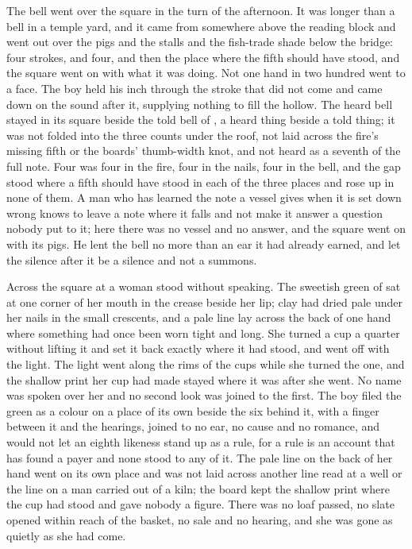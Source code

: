 The bell went over the square in the turn of the afternoon. It was longer than a bell in a temple yard, and it came from somewhere above the reading block and went out over the pigs and the stalls and the fish-trade shade below the bridge: four strokes, and four, and then the place where the fifth should have stood, and the square went on with what it was doing. Not one hand in two hundred went to a face. The boy held his inch through the stroke that did not come and came down on the sound after it, supplying nothing to fill the hollow. The heard bell stayed in its square beside the told bell of , a heard thing beside a told thing; it was not folded into the three counts under the roof, not laid across the fire's missing fifth or the boards' thumb-width knot, and not heard as a seventh of the full note. Four was four in the fire, four in the nails, four in the bell, and the gap stood where a fifth should have stood in each of the three places and rose up in none of them. A man who has learned the note a vessel gives when it is set down wrong knows to leave a note where it falls and not make it answer a question nobody put to it; here there was no vessel and no answer, and the square went on with its pigs. He lent the bell no more than an ear it had already earned, and let the silence after it be a silence and not a summons.

\scenebreak

Across the square at  a woman stood without speaking. The sweetish green of  sat at one corner of her mouth in the crease beside her lip; clay had dried pale under her nails in the small crescents, and a pale line lay across the back of one hand where something had once been worn tight and long. She turned a cup a quarter without lifting it and set it back exactly where it had stood, and went off with the light. The light went along the rims of the cups while she turned the one, and the shallow print her cup had made stayed where it was after she went. No name was spoken over her and no second look was joined to the first. The boy filed the green as a colour on a place of its own beside the six behind it, with a finger between it and the hearings, joined to no ear, no cause and no romance, and would not let an eighth likeness stand up as a rule, for a rule is an account that has found a payer and none stood to any of it. The pale line on the back of her hand went on its own place and was not laid across another line read at a well or the line on a man carried out of a kiln; the board kept the shallow print where the cup had stood and gave nobody a figure. There was no loaf passed, no slate opened within reach of the basket, no sale and no hearing, and she was gone as quietly as she had come.

